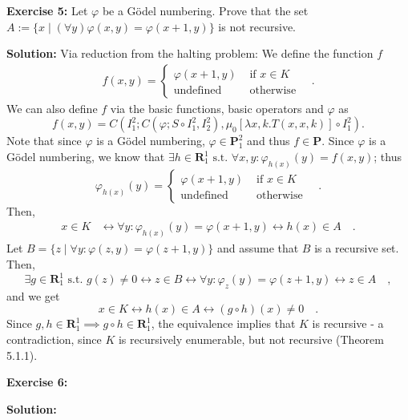 \documentclass [11pt]{article}
\newcommand{\R}{\textbf{R}}
\renewcommand{\P}{\textbf{P}}
\newcommand{\lra}{\ensuremath{\leftrightarrow}}
\begin{document}
\bigskip
\noindent
\textbf{Exercise 5:} Let $\varphi$ be a G\"odel numbering. Prove that the set $A:= \{x \mid (\forall y)\varphi(x,y) = \varphi(x+1,y)\}$ is not recursive.

\noindent
\textbf{Solution:} 
Via reduction from the halting problem:
We define the function $f$
\begin{align*}
 f(x,y) = \begin{cases}
           \varphi(x+1,y) & \text{ if } x \in K \\
           \text{undefined} & \text{ otherwise} 
          \end{cases} \quad .
\end{align*} 
We can also define $f$ via the basic functions, basic operators and $\varphi$ as
$$
f(x,y) = C(I^2_1; C(\varphi; S \circ I^2_1, I^2_2), \mu_0 [\lambda x,k.T(x,x,k)]\circ I^2_1).
$$
Note that since $\varphi$ is a G\"odel numbering, $\varphi \in \P^2_1$ and thus $f \in \P$.
Since $\varphi$ is a G\"odel numbering, we know that $\exists h \in \R^1_1 \text{ s.t.\ } \forall x,y:\varphi_{h(x)}(y) = f(x,y)$; thus
$$
\varphi_{h(x)}(y) = \begin{cases}
           \varphi(x+1,y) & \text{ if } x \in K \\
           \text{undefined} & \text{ otherwise}
          \end{cases} \quad.
$$
Then,
\begin{align*}
x \in K &\lra \forall y: \varphi_{h(x)}(y) = \varphi(x+1,y) \lra h(x) \in A \quad . 
\end{align*}
Let $B = \{z \mid \forall y: \varphi(z,y) =  \varphi(z+1,y)\}$ and assume that $B$ is a recursive set.
Then, 
$$
\exists g \in \R^1_1 \text{ s.t.\ } g(z) \neq 0 \lra z \in B \lra \forall y: \varphi_z(y) = \varphi(z+1,y) \lra z \in A \quad ,
$$
and we get 
$$
x \in K \lra h(x) \in A \lra (g \circ h)(x) \neq 0 \quad .
$$
Since $g,h \in \R^1_1 \implies g\circ h \in \R^1_1$, the equivalence implies that $K$ is recursive - a contradiction, since $K$ is recursively enumerable, but not recursive (Theorem 5.1.1).

\bigskip
\noindent
\textbf{Exercise 6:}

\noindent
\textbf{Solution:}
\end{document}
